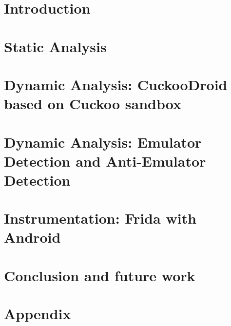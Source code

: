 \documentclass{report}
\begin{document}
	
	\pagebreak
	
	\pagebreak
	
	\pagebreak
	
	
	\tableofcontents
	\cleardoublepage
	\chapter{Introduction}\label{sec:intro}
		
		\pagebreak
	\chapter{Static Analysis}\label{sec:static_analysis}
		
		\pagebreak
	\chapter{Dynamic Analysis: CuckooDroid based on Cuckoo sandbox}\label{sec:cuckoodroid}
		
		\pagebreak
	
	\chapter{Dynamic Analysis: Emulator Detection and Anti-Emulator Detection} \label{sec:Chp4}
		
		\pagebreak
	
	\chapter{Instrumentation: Frida with Android} \label{sec:Chp5}
		
		\pagebreak

	\chapter{Conclusion and future work} \label{conclusion}
		
		\pagebreak



	
	
	\pagebreak
	
	\pagebreak
	
	\pagebreak
	
	\pagebreak

	\chapter{Appendix}
	
	\pagebreak
	
\end{document}
